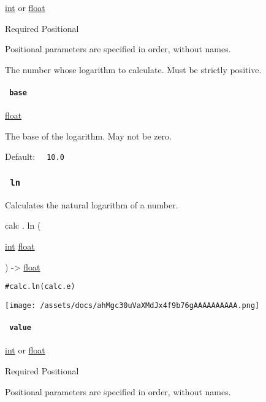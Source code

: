 \href{/docs/reference/foundations/int/}{int} {or}
\href{/docs/reference/foundations/float/}{float}

{Required} {{ Positional }}

\label{functions-log-value-positional-tooltip}
Positional parameters are specified in order, without names.

The number whose logarithm to calculate. Must be strictly positive.

\paragraph{\texorpdfstring{\texttt{\ base\ }}{ base }}\label{functions-log-base}

\href{/docs/reference/foundations/float/}{float}

The base of the logarithm. May not be zero.

Default: \texttt{\ }{\texttt{\ 10.0\ }}\texttt{\ }

\subsubsection{\texorpdfstring{\texttt{\ ln\ }}{ ln }}\label{functions-ln}

Calculates the natural logarithm of a number.

calc { . } { ln } (

{ \href{/docs/reference/foundations/int/}{int}
\href{/docs/reference/foundations/float/}{float} }

) -\textgreater{} \href{/docs/reference/foundations/float/}{float}

\begin{verbatim}
#calc.ln(calc.e)
\end{verbatim}

\texttt{[image: /assets/docs/ahMgc30uVaXMdJx4f9b76gAAAAAAAAAA.png]}

\paragraph{\texorpdfstring{\texttt{\ value\ }}{ value }}\label{functions-ln-value}

\href{/docs/reference/foundations/int/}{int} {or}
\href{/docs/reference/foundations/float/}{float}

{Required} {{ Positional }}

\label{functions-ln-value-positional-tooltip}
Positional parameters are specified in order, without names.

